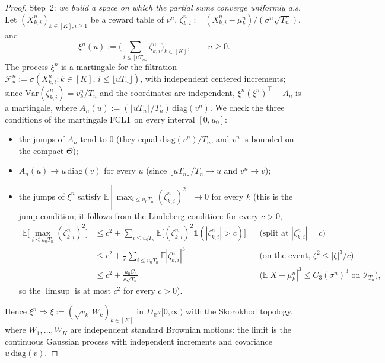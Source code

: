 \documentclass[11pt]{article}
\newcommand{\R}{\mathbb{R}}
\newcommand{\E}{\mathbb{E}}
\newcommand{\1}{\mathbf{1}}
\begin{document}
\begin{proof}
Step~2: \emph{we build a space on which the partial sums converge uniformly a.s.} Let $(X^n_{k,i})_{k\in[K],i\ge1}$ be a reward table of $\nu^n$,
$\zeta^n_{k,i}:=(X^n_{k,i}-\mu^n_k)/(\sigma^n\sqrt{T_n})$, and
\[
\xi^n(u):=\Big(\sum_{i\le\lfloor uT_n\rfloor}\zeta^n_{k,i}\Big)_{k\in[K]},\qquad u\ge0 .
\]
The process $\xi^n$ is a martingale for the filtration $\mathcal F^n_u:=\sigma(X^n_{k,i}:k\in[K],\,i\le\lfloor uT_n\rfloor)$, with independent centered
increments; since $\mathrm{Var}(\zeta^n_{k,i})=v^n_k/T_n$ and the coordinates are independent, $\xi^n(\xi^n)^{\top}-A_n$ is a martingale, where
$A_n(u):=(\lfloor uT_n\rfloor/T_n)\,\mathrm{diag}(v^n)$. We check the three conditions of the martingale FCLT \citep[Chap.~7, Thm~1.4(b)]{EK86} on every interval
$[0,u_0]$:
\begin{itemize}
\item the jumps of $A_n$ tend to $0$ (they equal $\mathrm{diag}(v^n)/T_n$, and $v^n$ is bounded on the compact $\Theta$);
\item $A_n(u)\to u\,\mathrm{diag}(v)$ for every $u$ (since $\lfloor uT_n\rfloor/T_n\to u$ and $v^n\to v$);
\item the jumps of $\xi^n$ satisfy $\E[\max_{i\le u_0T_n}(\zeta^n_{k,i})^2]\to0$ for every $k$ (this is the jump condition; it follows from the Lindeberg condition:
for every $c>0$,
\begin{align*}
\E\Big[\max_{i\le u_0T_n}(\zeta^n_{k,i})^2\Big]&\le c^2+\sum_{i\le u_0T_n}\E\big[(\zeta^n_{k,i})^2\1(|\zeta^n_{k,i}|>c)\big] &&\text{(split at $|\zeta^n_{k,i}|=c$)}\\
&\le c^2+\frac1c\sum_{i\le u_0T_n}\E|\zeta^n_{k,i}|^3 &&\text{(on the event, $\zeta^2\le|\zeta|^3/c$)}\\
&\le c^2+\frac{u_0C_3}{c\sqrt{T_n}} &&\text{($\E|X-\mu^n_k|^3\le C_3(\sigma^n)^3$ on $\mathcal I_{T_n}$)},
\end{align*}
so the $\limsup$ is at most $c^2$ for every $c>0$).
\end{itemize}
Hence $\xi^n\Rightarrow\xi:=(\sqrt{v_k}\,W_k)_{k\in[K]}$ in $D_{\R^K}[0,\infty)$ with the Skorokhod topology, where $W_1,\dots,W_K$ are independent standard Brownian
motions: the limit is the continuous Gaussian process with independent increments and covariance $u\,\mathrm{diag}(v)$.


\end{proof}
\end{document}
